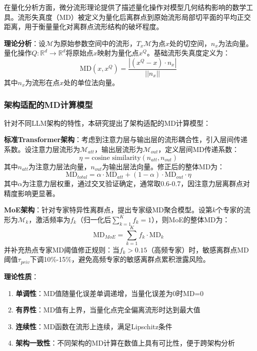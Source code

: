 在量化分析方面，微分流形理论提供了描述量化操作对模型几何结构影响的数学工具。流形失真度（MD）被定义为量化后离群点到原始流形局部切平面的平均正交距离，用于衡量量化对离群点流形结构的破坏程度。

\textbf{理论分析}：设$\mathcal{M}$为原始参数空间中的流形，$T_x\mathcal{M}$为点$x$处的切空间，$n_x$为法向量。量化操作$Q: \mathbb{R}^d \rightarrow \mathbb{R}^d$将原始点$x$映射为量化点$x^Q$。基础流形失真度定义为：
\begin{equation}
\text{MD}(x, x^Q) = \frac{|(x^Q - x) \cdot n_x|}{||n_x||}
\end{equation}
其中$n_x$为流形在点$x$处的单位法向量。

\subsubsection{架构适配的MD计算模型}

针对不同LLM架构的特性，本研究提出了架构适配的MD计算模型：

\textbf{标准Transformer架构}：考虑到注意力层与输出层的流形耦合性，引入层间传递系数。设注意力层流形为$\mathcal{M}_{att}$，输出层流形为$\mathcal{M}_{out}$，定义层间MD传递系数：
\begin{equation}
\eta = \text{cosine similarity}(n_{att}, n_{out})
\end{equation}
其中$n_{att}$为注意力层法向量，$n_{out}$为输出层法向量。修正后的整体MD为：
\begin{equation}
\text{MD}_{total} = \alpha \cdot \text{MD}_{att} + (1-\alpha) \cdot \text{MD}_{out} \cdot \eta
\end{equation}
其中$\alpha$为注意力层权重，通过交叉验证确定，通常取0.6-0.7，因注意力层离群点对精度影响更显著。

\textbf{MoE架构}：针对专家特异性离群点，提出专家级MD聚合模型。设第$k$个专家的流形为$\mathcal{M}_k$，激活频率为$f_k$（归一化后$\sum_{k=1}^K f_k=1$），则MoE的整体MD为：
\begin{equation}
\text{MD}_{MoE} = \sum_{k=1}^K f_k \cdot \text{MD}_k
\end{equation}
并补充热点专家MD阈值修正规则：当$f_k > 0.15$（高频专家）时，敏感离群点MD阈值$\tau_{priv}$下调10\%-15\%，避免高频专家的敏感离群点累积泄露风险。

\textbf{理论性质}：
\begin{enumerate}
\item \textbf{单调性}：MD值随量化误差单调递增，当量化误差为0时MD=0
\item \textbf{有界性}：MD值有上界，当量化点完全偏离流形时达到最大值
\item \textbf{连续性}：MD函数在流形上连续，满足Lipschitz条件
\item \textbf{架构一致性}：不同架构的MD计算在数值上具有可比性，便于跨架构分析
\end{enumerate}

